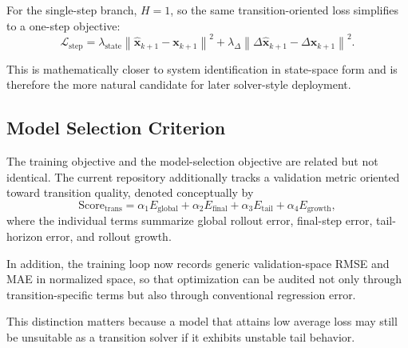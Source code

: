 For the single-step branch, $H=1$, so the same transition-oriented loss simplifies to a one-step objective:
\begin{equation}
\mathcal{L}_{\mathrm{step}}
=
\lambda_{\mathrm{state}}
\left\|
\hat{\mathbf{x}}_{k+1} - \mathbf{x}_{k+1}
\right\|^{2}
+
\lambda_{\Delta}
\left\|
\Delta \hat{\mathbf{x}}_{k+1} - \Delta \mathbf{x}_{k+1}
\right\|^{2}.
\end{equation}

This is mathematically closer to system identification in state-space form and is therefore the more natural candidate for later solver-style deployment.

\subsection{Model Selection Criterion}

The training objective and the model-selection objective are related but not identical.
The current repository additionally tracks a validation metric oriented toward transition quality, denoted conceptually by
\begin{equation}
\mathrm{Score}_{\mathrm{trans}}
=
\alpha_1 E_{\mathrm{global}}
+
\alpha_2 E_{\mathrm{final}}
+
\alpha_3 E_{\mathrm{tail}}
+
\alpha_4 E_{\mathrm{growth}},
\end{equation}
where the individual terms summarize global rollout error, final-step error, tail-horizon error, and rollout growth.

In addition, the training loop now records generic validation-space RMSE and MAE in normalized space,
so that optimization can be audited not only through transition-specific terms but also through conventional regression error.

This distinction matters because a model that attains low average loss may still be unsuitable as a transition solver if it exhibits unstable tail behavior.
